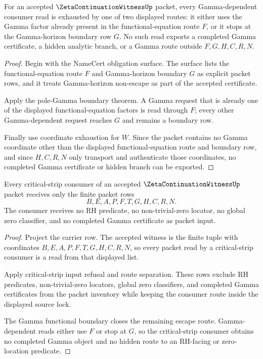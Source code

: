 \begin{theorem}
\label{thm:zeta-continuation-witness-gamma-functional-boundary-totality}
For an accepted $\ZetaContinuationWitnessUp$ packet, every Gamma-dependent consumer read is exhausted by one of two displayed routes: it either uses the Gamma factor already present in the functional-equation route $F$, or it stops at the Gamma-horizon boundary row $G$. No such read exports a completed Gamma certificate, a hidden analytic branch, or a Gamma route outside $F,G,H,C,R,N$.
\end{theorem}
\begin{proof}
Begin with the NameCert obligation surface. The surface lists the functional-equation route $F$ and Gamma-horizon boundary $G$ as explicit packet rows, and it treats Gamma-horizon non-escape as part of the accepted certificate.

Apply the pole-Gamma boundary theorem. A Gamma request that is already one of the displayed functional-equation factors is read through $F$; every other Gamma-dependent request reaches $G$ and remains a boundary row.

Finally use coordinate exhaustion for $W$. Since the packet contains no Gamma coordinate other than the displayed functional-equation route and boundary row, and since $H,C,R,N$ only transport and authenticate those coordinates, no completed Gamma certificate or hidden branch can be exported.
\end{proof}

\begin{theorem}
\label{thm:zeta-continuation-witness-critical-strip-consumer-nonescape}
Every critical-strip consumer of an accepted $\ZetaContinuationWitnessUp$ packet receives only the finite packet rows
$$
B,E,A,P,F,T,G,H,C,R,N.
$$
The consumer receives no RH predicate, no non-trivial-zero locator, no global zero classifier, and no completed Gamma certificate as packet input.
\end{theorem}
\begin{proof}
Project the carrier row. The accepted witness is the finite tuple with coordinates $B,E,A,P,F,T,G,H,C,R,N$, so every packet read by a critical-strip consumer is a read from that displayed list.

Apply critical-strip input refusal and route separation. These rows exclude RH predicates, non-trivial-zero locators, global zero classifiers, and completed Gamma certificates from the packet inventory while keeping the consumer route inside the displayed source lock.

The Gamma functional boundary closes the remaining escape route. Gamma-dependent reads either use $F$ or stop at $G$, so the critical-strip consumer obtains no completed Gamma object and no hidden route to an RH-facing or zero-location predicate.
\end{proof}
